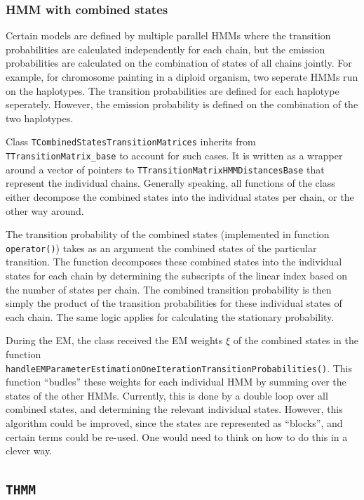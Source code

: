 \documentclass[a4paper,11pt]{article}
\newcommand{\class}[1]{\texttt{#1}}
\newcommand{\pubfunc}[1]{\texttt{#1()}}
\begin{document}
\subsubsection{HMM with combined states}\label{section:CombinedStatesHMM}
Certain models are defined by multiple parallel HMMs where the transition probabilities are calculated independently for each chain, but the emission probabilities are calculated on the combination of states of all chains jointly. For example, for chromosome painting in a diploid organism, two seperate HMMs run on the haplotypes. The transition probabilities are defined for each haplotype seperately. However, the emission probability is defined on the combination of the two haplotypes.

Class \class{TCombinedStatesTransitionMatrices} inherits from \class{TTransitionMatrix\_base} to account for such cases. It is written as a wrapper around a vector of pointers to  \class{TTransitionMatrixHMMDistancesBase} that represent the individual chains. Generally speaking, all functions of the class either decompose the combined states into the individual states per chain, or the other way around.

The transition probability of the combined states (implemented in function \pubfunc{operator}) takes as an argument the combined states of the particular transition. The function decomposes these combined states into the individual states for each chain by determining the subscripts of the linear index based on the number of states per chain. The combined transition probability is then simply the product of the transition probabilities for these individual states of each chain. The same logic applies for calculating the stationary probability.

During the EM, the class received the EM weights $\xi$ of the combined states in the function \pubfunc{handleEMParameterEstimationOneIterationTransitionProbabilities}. This function ``budles'' these weights for each individual HMM by summing over the states of the other HMMs. Currently, this is done by a double loop over all combined states, and determining the relevant individual states. However, this algorithm could be improved, since the states are represented as ``blocks'', and certain terms could be re-used. One would need to think on how to do this in a clever way.


\subsection{\class{THMM}}
\end{document}
